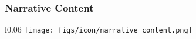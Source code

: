




\subsubsection{Narrative Content}

\begin{wrapfigure}{l}{0.06\textwidth}
  \vspace{-11pt} %
       \texttt{[image: figs/icon/narrative\_content.png]}
\end{wrapfigure} 

